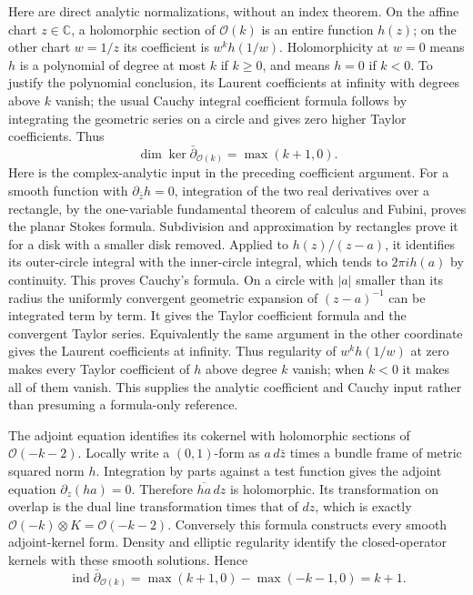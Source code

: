 \documentclass[
  11pt,
]{article}
\begin{document}
Here are direct analytic normalizations, without an index theorem. On
the affine chart \(z\in\mathbb C\), a holomorphic section of
\(\mathcal O(k)\) is an entire function \(h(z)\); on the other chart
\(w=1/z\) its coefficient is \(w^kh(1/w)\). Holomorphicity at \(w=0\)
means \(h\) is a polynomial of degree at most \(k\) if \(k\geq0\), and
means \(h=0\) if \(k<0\). To justify the polynomial conclusion, its
Laurent coefficients at infinity with degrees above \(k\) vanish; the
usual Cauchy integral coefficient formula follows by integrating the
geometric series on a circle and gives zero higher Taylor coefficients.
Thus \[
 \dim\ker\bar\partial_{\mathcal O(k)}=\max(k+1,0).
\] Here is the complex-analytic input in the preceding coefficient
argument. For a smooth function with \(\partial_{\bar z}h=0\),
integration of the two real derivatives over a rectangle, by the
one-variable fundamental theorem of calculus and Fubini, proves the
planar Stokes formula. Subdivision and approximation by rectangles prove
it for a disk with a smaller disk removed. Applied to \(h(z)/(z-a)\), it
identifies its outer-circle integral with the inner-circle integral,
which tends to \(2\pi i h(a)\) by continuity. This proves Cauchy's
formula. On a circle with \(|a|\) smaller than its radius the uniformly
convergent geometric expansion of \((z-a)^{-1}\) can be integrated term
by term. It gives the Taylor coefficient formula and the convergent
Taylor series. Equivalently the same argument in the other coordinate
gives the Laurent coefficients at infinity. Thus regularity of
\(w^kh(1/w)\) at zero makes every Taylor coefficient of \(h\) above
degree \(k\) vanish; when \(k<0\) it makes all of them vanish. This
supplies the analytic coefficient and Cauchy input rather than presuming
a formula-only reference.

The adjoint equation identifies its cokernel with holomorphic sections
of \(\mathcal O(-k-2)\). Locally write a \((0,1)\)-form as
\(a\,d\bar z\) times a bundle frame of metric squared norm \(h\).
Integration by parts against a test function gives the adjoint equation
\(\partial_z(ha)=0\). Therefore \(\overline{ha}\,dz\) is holomorphic.
Its transformation on overlap is the dual line transformation times that
of \(dz\), which is exactly
\(\mathcal O(-k)\otimes K=\mathcal O(-k-2)\). Conversely this formula
constructs every smooth adjoint-kernel form. Density and elliptic
regularity identify the closed-operator kernels with these smooth
solutions. Hence \[
 \operatorname{ind}\bar\partial_{\mathcal O(k)}
 =\max(k+1,0)-\max(-k-1,0)=k+1.
 \tag{CI.41}
\]
\end{document}
